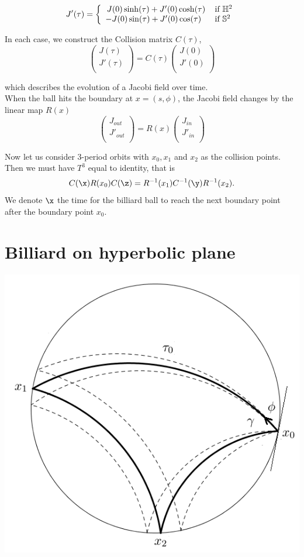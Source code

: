\documentclass[11pt]{article}
\theoremstyle{plain}
\theoremstyle{definition}
\begin{document}
\[
J'(\tau)=\left\{ \begin{array}{cl}
J(0) \sinh(\tau)+J'(0) \cosh(\tau)& $if $\mathbb{H}^2 \\
-J(0)\sin(\tau) + J'(0)\cos(\tau)\,\,\,\,& $if $\mathbb{S}^2\\
 \end{array} \right.
\]

In each case, we construct the Collision matrix $C(\tau)$,
\[
\left( \begin{array}{c}
J(\tau) \\
J'(\tau) \\
 \end{array} \right)
= C(\tau)
\left( \begin{array}{c}
J(0) \\
J'(0) \\
 \end{array} \right)
\]

which describes the evolution of a Jacobi field over time.\\


When the ball hits the boundary at $x=(s, \phi)$, the Jacobi field changes by the linear map $R(x)$
\[
\left( \begin{array}{r}
J_{out} \\
J'_{out} \\
 \end{array} \right)
=R(x)
 \left( \begin{array}{r}
J_{in} \\
J'_{in} \\
 \end{array} \right)
\]


Now let us consider 3-period orbits with $x_0, x_1$ and $x_2$ as the collision points. Then we must have $T^3$ equal to identity, that is
\[
C(\x)R(x_0)C(\z) = R^{-1}(x_1)C^{-1}(\y)R^{-1}(x_2).
\]
We denote $\x$ the time for the billiard ball to reach the next boundary point after the boundary point $x_0$.


\section{Billiard on hyperbolic plane}
\begin{center}
    \includegraphics[width=.5\textwidth]{hyperbolic.png}
 \end{center}
\end{document}
